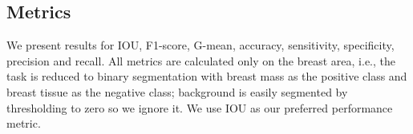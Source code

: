 \subsection{Metrics}
We present results for IOU, F1-score, G-mean, accuracy, sensitivity, specificity, precision and recall.
All metrics are calculated only on the breast area, i.e., the task is reduced to binary segmentation with breast mass as the positive class and breast tissue as the negative class; background is easily segmented by thresholding to zero so we ignore it.
We use IOU as our preferred performance metric.

